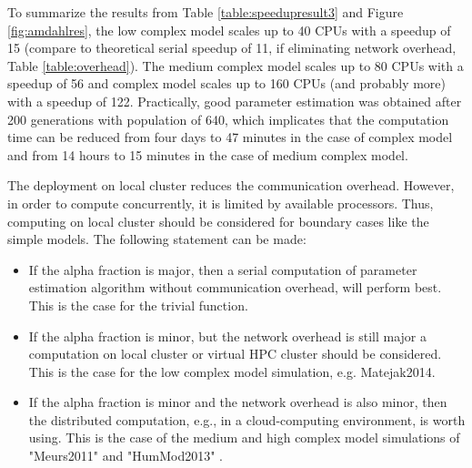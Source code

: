 To summarize the results from Table \ref{table:speedupresult3} and Figure \ref{fig:amdahlres}, the low complex model scales up to 40 CPUs with a speedup of 15 (compare to theoretical serial speedup of 11, if eliminating network overhead,  Table \ref{table:overhead}). The medium complex model scales up to 80 CPUs with a speedup of 56 and complex model scales up to 160 CPUs (and probably more) with a speedup of 122. Practically, good parameter estimation was obtained after 200 generations with population of 640, which implicates that the computation time can be reduced from four days to 47 minutes in the case of complex model and from 14 hours to 15 minutes in the case of medium complex model.

The deployment on local cluster reduces the communication overhead. However, in order to compute concurrently, it is limited by available processors. Thus, computing on local cluster should be considered for boundary cases like the simple models. The following statement can be made:
\begin{itemize}
\item{If the alpha fraction is major, then a serial computation of parameter estimation algorithm without communication overhead, will perform best. This is the case for the trivial function. }
\item{If the alpha fraction is minor, but the network overhead is still major a computation on local cluster or virtual HPC cluster should be considered. This is the case for the low complex model simulation, e.g.  Matejak2014\cite{Matejak2014sj}.} 
\item{If the alpha fraction is minor and the network overhead is also minor, then the distributed computation, e.g., in a cloud-computing environment, is worth using. This is the case of the medium and high complex model simulations of "Meurs2011" \cite{Meurs2011} and "HumMod2013" \cite{Kofranek2011hummod}.}
\end{itemize}

